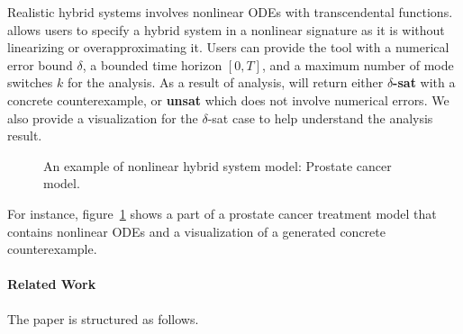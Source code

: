 Realistic hybrid systems involves nonlinear ODEs with transcendental
functions. \dReach{} allows users to specify a hybrid system in a
nonlinear signature as it is without linearizing or overapproximating
it. Users can provide the tool with a numerical error bound $\delta$,
a bounded time horizon $[0, T]$, and a maximum number of mode switches
$k$ for the analysis. As a result of analysis, \dReach{} will return
either \textbf{$\delta$-sat} with a concrete counterexample, or
\textbf{unsat} which does not involve numerical errors. We also
provide a visualization for the $\delta$-sat case to help
understand the analysis result.
\begin{figure}[!t]
  \hfill
  \caption{An example of nonlinear hybrid system model: Prostate
    cancer model.}
  \label{fig:prostate-example}
\end{figure}
For instance, figure~\ref{fig:prostate-example} shows a part of a
prostate cancer treatment model that contains nonlinear ODEs and a
visualization of a generated concrete counterexample.

\paragraph{Related Work}

The paper is structured as follows.


